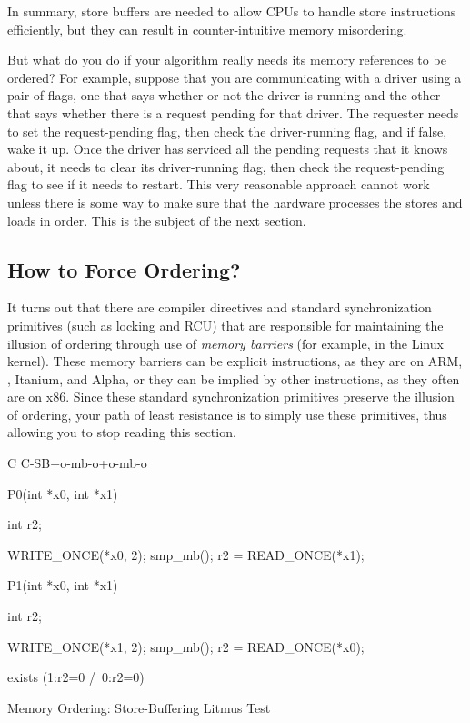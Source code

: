 In summary, store buffers are needed to allow CPUs to handle
store instructions efficiently, but they can result in
counter-intuitive memory misordering.

But what do you do if your algorithm really needs its memory
references to be ordered?
For example, suppose that you are communicating with a driver using
a pair of flags, one that says whether or not the driver is running
and the other that says whether there is a request pending for that
driver.
The requester needs to set the request-pending flag, then check
the driver-running flag, and if false, wake it up.
Once the driver has serviced all the pending requests that it knows about,
it needs to clear its driver-running flag, then check the request-pending
flag to see if it needs to restart.
This very reasonable approach cannot work unless there is some way
to make sure that the hardware processes the stores and loads in order.
This is the subject of the next section.

\subsection{How to Force Ordering?}
\label{sec:memorder:How to Force Ordering?}

It turns out that there are compiler directives and standard
synchronization primitives (such as locking and RCU)
that are responsible for maintaining the illusion of ordering through use of
\emph{memory barriers} (for example,  in the Linux kernel).
These memory barriers can be explicit instructions, as they are on
ARM, \Power{}, Itanium, and Alpha, or they can be implied by other instructions,
as they often are on x86.
Since these standard synchronization primitives preserve the illusion of
ordering, your path of least resistance is to simply use these primitives,
thus allowing you to stop reading this section.

\begin{listing}[tbp]
{ \scriptsize
\begin{verbbox}[\LstLineNo]
C C-SB+o-mb-o+o-mb-o
{
}

P0(int *x0, int *x1)
{
  int r2;

  WRITE_ONCE(*x0, 2);
  smp_mb();
  r2 = READ_ONCE(*x1);
}


P1(int *x0, int *x1)
{
  int r2;

  WRITE_ONCE(*x1, 2);
  smp_mb();
  r2 = READ_ONCE(*x0);
}

exists (1:r2=0 /\ 0:r2=0)
\end{verbbox}
}
\centering
\theverbbox
\caption{Memory Ordering: Store-Buffering Litmus Test}
\label{lst:memorder:Memory Ordering: Store-Buffering Litmus Test}
\end{listing}

